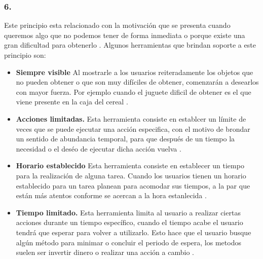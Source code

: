 \subsubsection{6. \principioVI} \label{subsec:principioVI}

 Este principio esta relacionado con la motivación que se presenta cuando queremos algo
 que no podemos tener de forma inmediata  o porque existe una gran dificultad para obtenerlo
 \cite[p. 233]{Octalysis}. Algunos herramientas que brindan soporte a este principio son:
        
    \begin{itemize}
    \item
    {\bf Siempre visible} %
        Al mostrarle a los usuarios reiteradamente los objetos que no pueden obtener o que
        son muy difíciles de obtener, comenzarán a desearlos con mayor fuerza. Por ejemplo
        cuando el juguete dificil de obtener es el que viene presente en la caja del cereal
        \cite[p. 252]{Octalysis}.
            
    \item
    {\bf Acciones limitadas.} %
        Esta herramienta consiste en establcer un límite de veces que se puede ejecutar una
        acción especifica, con el motivo de brondar un sentido de abundancia temporal, para
        que después de un tiempo la necesidad o el deséo de ejecutar dicha acción vuelva
        \cite[p. 256]{Octalysis}.
            
    \item
    {\bf Horario establecido} %
        Esta herramienta consiste en establecer un tiempo para la realización de alguna tarea.
        Cuando los usuarios tienen un horario establecido para un tarea planean para acomodar
        sus tiempos, a la par que están más atentos conforme se acercan a la hora estanlecida
        \cite[p. 258]{Octalysis}.
            
    \item
    {\bf Tiempo limitado.} %
        Esta herramienta limita al usuario a realizar ciertas acciones durante un tiempo
        específico, cuando el tiempo acabe el usuario tendrá que esperar para volver a
        utilizarlo. Esto hace que el usuario busque algún método para minimar o concluir
        el periodo de espera, los metodos suelen ser invertir dinero o realizar una acción
        a cambio \cite[p. 261]{Octalysis}.
    \end{itemize}

